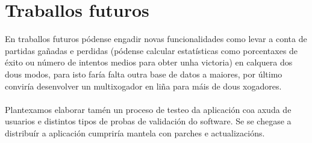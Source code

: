 \section{Traballos futuros}
En traballos futuros pódense engadir novas funcionalidades como levar a conta de partidas gañadas e perdidas (pódense calcular estatísticas como porcentaxes de éxito ou número de intentos medios para obter unha victoria) en calquera dos dous modos, para isto faría falta outra base de datos a maiores, por último conviría desenvolver un multixogador en liña para máis de dous xogadores.\\
\\
Plantexamos elaborar tamén un proceso de testeo da aplicación coa axuda de usuarios e distintos tipos de probas de validación do software. Se se chegase a distribuír a aplicación cumpriría mantela con parches e actualizacións.
 \let\cleardoublepage=\clearpage 